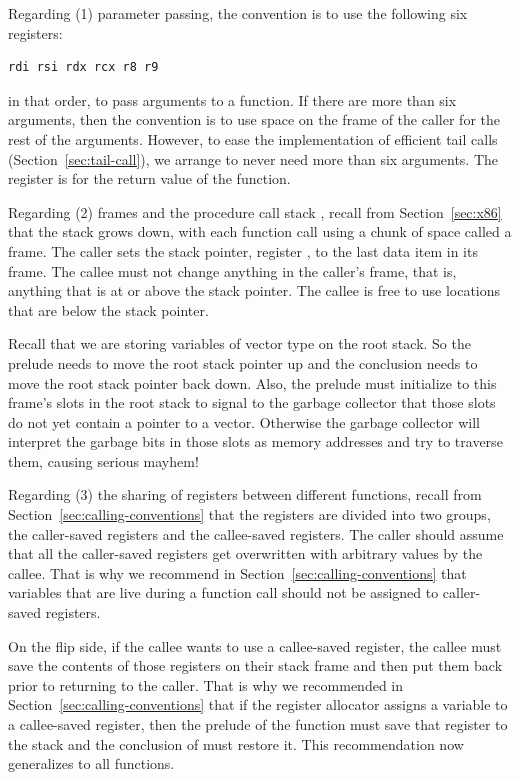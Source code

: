 \documentclass[11pt]{book}
\begin{document}
Regarding (1) parameter passing, the convention is to use the
following six registers:
\begin{lstlisting}
rdi rsi rdx rcx r8 r9
\end{lstlisting}
in that order, to pass arguments to a function. If there are more than
six arguments, then the convention is to use space on the frame of the
caller for the rest of the arguments. However, to ease the
implementation of efficient tail calls (Section~\ref{sec:tail-call}),
we arrange to never need more than six arguments.
%
The register  is for the return value of the function.


Regarding (2) frames  and the procedure call stack
, recall from Section~\ref{sec:x86} that
the stack grows down, with each function call using a chunk of space
called a frame. The caller sets the stack pointer, register
, to the last data item in its frame. The callee must not
change anything in the caller's frame, that is, anything that is at or
above the stack pointer. The callee is free to use locations that are
below the stack pointer.

Recall that we are storing variables of vector type on the root stack.
So the prelude needs to move the root stack pointer  up and
the conclusion needs to move the root stack pointer back down.  Also,
the prelude must initialize to  this frame's slots in the root
stack to signal to the garbage collector that those slots do not yet
contain a pointer to a vector. Otherwise the garbage collector will
interpret the garbage bits in those slots as memory addresses and try
to traverse them, causing serious mayhem!

Regarding (3) the sharing of registers between different functions,
recall from Section~\ref{sec:calling-conventions} that the registers
are divided into two groups, the caller-saved registers and the
callee-saved registers. The caller should assume that all the
caller-saved registers get overwritten with arbitrary values by the
callee. That is why we recommend in
Section~\ref{sec:calling-conventions} that variables that are live
during a function call should not be assigned to caller-saved
registers.

On the flip side, if the callee wants to use a callee-saved register,
the callee must save the contents of those registers on their stack
frame and then put them back prior to returning to the caller.  That
is why we recommended in Section~\ref{sec:calling-conventions} that if
the register allocator assigns a variable to a callee-saved register,
then the prelude of the  function must save that register
to the stack and the conclusion of  must restore it.  This
recommendation now generalizes to all functions.
\end{document}
